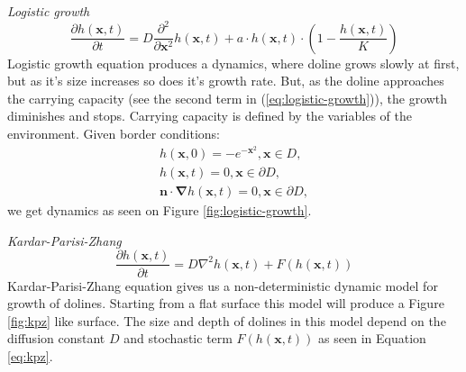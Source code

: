 \documentclass[a0,portrait]{a0poster}
\begin{document}
\begin{multicols}{2}
\vspace{5mm}
\textit{Logistic growth}
\begin{equation}
	\frac{ \partial h(\mathbf{x},t) }{ \partial t} = D \frac{\partial^2}{\partial \mathbf{x}^2} h(\mathbf{x},t) + a \cdot h(\mathbf{x},t) \cdot (1 - \frac{h(\mathbf{x},t)}{K})
	\label{eq:logistic-growth}
\end{equation}
Logistic growth equation produces a dynamics, where doline grows slowly at first, but as it's size increases so does it's growth rate. But, as the doline approaches the carrying capacity (see the second term in (\ref{eq:logistic-growth})), the growth diminishes and stops. Carrying capacity is defined by the variables of the environment.
Given border conditions:
\begin{equation}
	\begin{aligned}
		h(\mathbf{x},0) =  - e^{-\mathbf{x}^2}, \mathbf{x} \in D, \\
		h(\mathbf{x},t) = 0, \mathbf{x} \in \partial D, \\
		\mathbf{n} \cdot \boldsymbol \nabla h(\mathbf{x},t) = 0, \mathbf{x} \in \partial D,
	\end{aligned}
\end{equation}
we get dynamics as seen on Figure \ref{fig:logistic-growth}.

\vspace{5mm}
\textit{Kardar-Parisi-Zhang}
\begin{equation} \frac{ \partial h(\mathbf{x},t)}{ \partial t} = D \nabla^2 h(\mathbf{x},t) + F(h(\mathbf{x},t)) \label{eq:kpz} \end{equation}
Kardar-Parisi-Zhang equation gives us a non-deterministic dynamic model for growth of dolines. Starting from a flat surface this model will produce a Figure \ref{fig:kpz} like surface. The size and depth of dolines in this model depend on the diffusion constant $D$ and stochastic term $F(h(\mathbf{x},t))$ as seen in Equation \ref{eq:kpz}.


\end{multicols}
\end{document}
